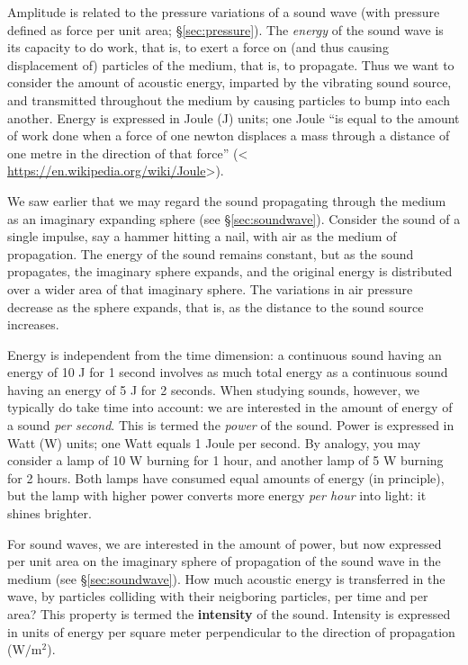 \documentclass[
]{book}
\begin{document}
Amplitude is related to the pressure variations of a sound wave (with pressure defined as force per unit area; §\ref{sec:pressure}). The \emph{energy} of the sound wave is its capacity to do work, that is, to exert a force on (and thus causing displacement of) particles of the medium, that is, to propagate. Thus we want to consider the amount of acoustic energy, imparted by the vibrating sound source, and transmitted throughout the medium by causing particles to bump into each another. Energy is expressed in Joule (J) units; one Joule ``is equal to the amount of work done when a force of one newton displaces a mass through a distance of one metre in the direction of that force'' (\textless{} \url{https://en.wikipedia.org/wiki/Joule}\textgreater).

We saw earlier that we may regard the sound propagating through the medium as an imaginary expanding sphere (see §\ref{sec:soundwave}). Consider the sound of a single impulse, say a hammer hitting a nail, with air as the medium of propagation. The energy of the sound remains constant, but as the sound propagates, the imaginary sphere expands, and the original energy is distributed over a wider area of that imaginary sphere. The variations in air pressure decrease as the sphere expands, that is, as the distance to the sound source increases.

Energy is independent from the time dimension: a continuous sound having an energy of 10 J for 1 second involves as much total energy as a continuous sound having an energy of 5 J for 2 seconds. When studying sounds, however, we typically do take time into account: we are interested in the amount of energy of a sound \emph{per second}. This is termed the \emph{power} of the sound. Power is expressed in Watt (W) units; one Watt equals 1 Joule per second. By analogy, you may consider a lamp of 10 W burning for 1 hour, and another lamp of 5 W burning for 2 hours. Both lamps have consumed equal amounts of energy (in principle), but the lamp with higher power converts more energy \emph{per hour} into light: it shines brighter.

For sound waves, we are interested in the amount of power, but now expressed per unit area on the imaginary sphere of propagation of the sound wave in the medium (see §\ref{sec:soundwave}). How much acoustic energy is transferred in the wave, by particles colliding with their neigboring particles, per time and per area? This property is termed the \textbf{intensity} of the sound. Intensity is expressed in units of energy per square meter perpendicular to the direction of propagation (\(\textrm{W}/\textrm{m}^2\)).
\end{document}

